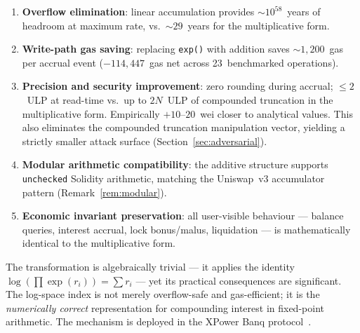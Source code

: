 \documentclass[10pt,a4paper,twocolumn]{article}
\theoremstyle{definition}
\theoremstyle{plain}
\theoremstyle{remark}
\begin{document}
\begin{enumerate}[leftmargin=*, nosep]
\item \textbf{Overflow elimination}: linear accumulation provides ${\sim}10^{58}$~years of headroom at maximum rate, vs.\ ${\sim}29$~years for the multiplicative form.

\item \textbf{Write-path gas saving}: replacing \texttt{exp()} with addition saves ${\sim}1{,}200$~gas per accrual event ($-114{,}447$~gas net across 23~benchmarked operations).

\item \textbf{Precision and security improvement}: zero rounding during accrual; $\leq 2$~ULP at read-time vs.\ up to $2N$~ULP of compounded truncation in the multiplicative form. Empirically $+10$--$20$~wei closer to analytical values. This also eliminates the compounded truncation manipulation vector, yielding a strictly smaller attack surface (Section~\ref{sec:adversarial}).

\item \textbf{Modular arithmetic compatibility}: the additive structure supports \texttt{unchecked} Solidity arithmetic, matching the Uniswap~v3 accumulator pattern (Remark~\ref{rem:modular}).

\item \textbf{Economic invariant preservation}: all user-visible behaviour --- balance queries, interest accrual, lock bonus/malus, liquidation --- is mathematically identical to the multiplicative form.
\end{enumerate}

The transformation is algebraically trivial --- it applies the identity $\log(\prod \exp(r_i)) = \sum r_i$ --- yet its practical consequences are significant. The log-space index is not merely overflow-safe and gas-efficient; it is the \emph{numerically correct} representation for compounding interest in fixed-point arithmetic. The mechanism is deployed in the XPower Banq protocol~\cite{wp}.
\end{document}
